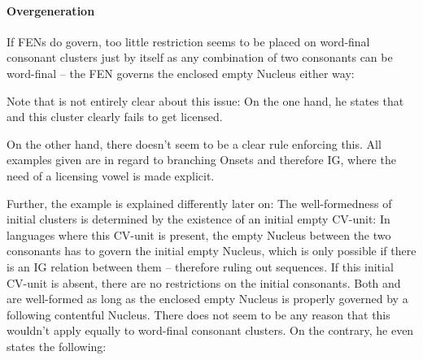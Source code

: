 \paragraph{}


\paragraph{Overgeneration}
If \glspl{FEN} do govern, too little restriction seems to be placed on
word-final consonant clusters just by \CVCV itself as any combination of
two consonants can be word-final -- the \gls{FEN} governs
the enclosed empty Nucleus either way:

\ti{*[Sa:kf]}
\begin{structure}
  \wordstart
  \emptyV
  \fen
\end{structure}

Note that \cite{scheer2004} is not entirely clear about this issue:
On the one hand, he states that
and this cluster clearly fails to get licensed.


On the other hand, there doesn't seem to be a clear rule enforcing this.
All examples given are in regard to branching Onsets and therefore \gls{IG},
where the need of a licensing vowel is made explicit.

Further, the  example is explained differently later on:
The well-formedness of initial  clusters is determined by the existence
of an initial empty CV-unit:
In languages where this CV-unit is present, the empty Nucleus between the two consonants
has to govern the initial empty Nucleus, which is only possible if there is
an \gls{IG} relation between them -- therefore ruling out  sequences.
If this initial CV-unit is absent, there are no restrictions on the initial consonants.
Both  and  are well-formed as long as the enclosed empty Nucleus
is properly governed by a following contentful Nucleus.
There does not seem to be any reason that this wouldn't apply equally to word-final
consonant clusters. On the contrary, he even states the following:

